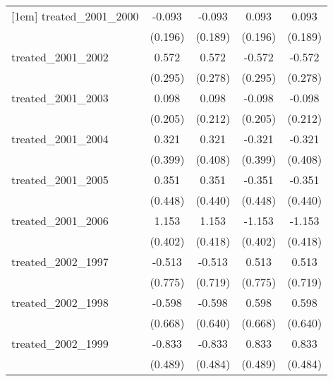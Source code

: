 {\begin{tabular}{l*{4}{c}}
[1em]
treated\_2001\_2000&      -0.093         &      -0.093         &       0.093         &       0.093         \\
            &     (0.196)         &     (0.189)         &     (0.196)         &     (0.189)         \\
[1em]
treated\_2001\_2002&       0.572         &       0.572\sym{*}  &      -0.572         &      -0.572\sym{*}  \\
            &     (0.295)         &     (0.278)         &     (0.295)         &     (0.278)         \\
[1em]
treated\_2001\_2003&       0.098         &       0.098         &      -0.098         &      -0.098         \\
            &     (0.205)         &     (0.212)         &     (0.205)         &     (0.212)         \\
[1em]
treated\_2001\_2004&       0.321         &       0.321         &      -0.321         &      -0.321         \\
            &     (0.399)         &     (0.408)         &     (0.399)         &     (0.408)         \\
[1em]
treated\_2001\_2005&       0.351         &       0.351         &      -0.351         &      -0.351         \\
            &     (0.448)         &     (0.440)         &     (0.448)         &     (0.440)         \\
[1em]
treated\_2001\_2006&       1.153\sym{**} &       1.153\sym{**} &      -1.153\sym{**} &      -1.153\sym{**} \\
            &     (0.402)         &     (0.418)         &     (0.402)         &     (0.418)         \\
[1em]
treated\_2002\_1997&      -0.513         &      -0.513         &       0.513         &       0.513         \\
            &     (0.775)         &     (0.719)         &     (0.775)         &     (0.719)         \\
[1em]
treated\_2002\_1998&      -0.598         &      -0.598         &       0.598         &       0.598         \\
            &     (0.668)         &     (0.640)         &     (0.668)         &     (0.640)         \\
[1em]
treated\_2002\_1999&      -0.833         &      -0.833         &       0.833         &       0.833         \\
            &     (0.489)         &     (0.484)         &     (0.489)         &     (0.484)         \\

\end{tabular}}
